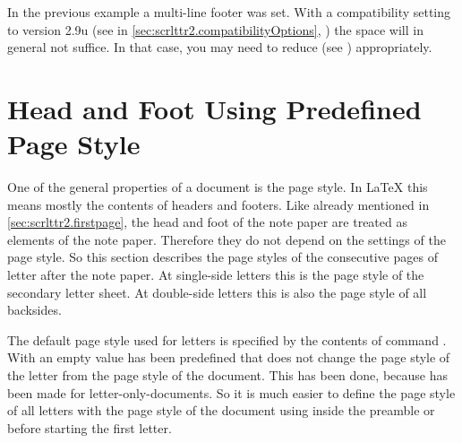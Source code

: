 In the previous example a multi-line footer was set.  With a compatibility
setting to version 2.9u (see  in
\autoref{sec:scrlttr2.compatibilityOptions},
) the space will in general not
suffice. In that case, you may need to reduce  (see
) appropriately.%
%
\EndIndexGroup
%
\EndIndexGroup
%
\EndIndexGroup





\section{Head and Foot Using Predefined Page Style}
\BeginIndexGroup
{}%
%
%

One of the general properties of a document is the page style. In {\LaTeX}
this means mostly the contents of headers and
footers. Like already mentioned in
\autoref{sec:scrlttr2.firstpage}, the head and foot of the note paper are
treated as elements of the note paper. Therefore they do not depend on the
settings of the page style. So this section describes the page styles of the
consecutive pages of letter after the note paper. At single-side letters this is
the page style of the secondary letter sheet. At double-side letters this is
also the page style of all backsides.


\begin{Declaration}
\end{Declaration}
The default page
style used for letters is specified by the contents of command
. With  an empty value has been
predefined that does not change the
page style of the letter from the page style of the document. This has been
done, because  has been made for letter-only-documents. So it
is much easier to define the page style of all letters with the page style of
the document using  inside the preamble or before starting
the first letter.

